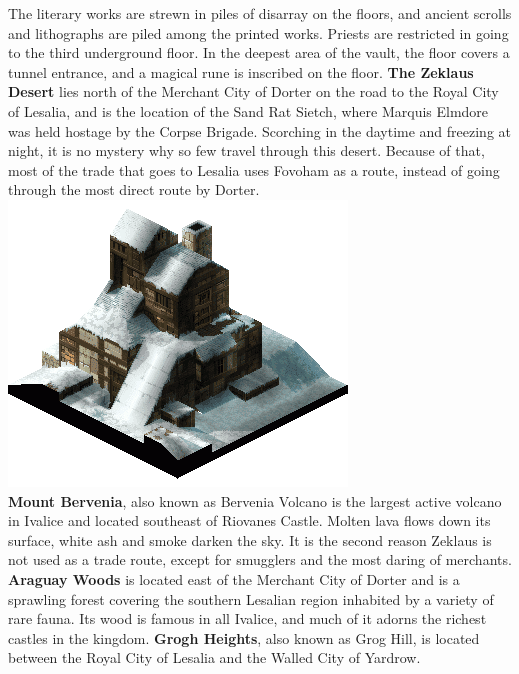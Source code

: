 The literary works are strewn in piles of disarray on the floors, and ancient scrolls and lithographs are piled among the printed works. 
Priests are restricted in going to the third underground floor. 
In the deepest area of the vault, the floor covers a tunnel entrance, and a magical rune is inscribed on the floor.
\textbf{The Zeklaus Desert} lies north of the Merchant City of Dorter on the road to the Royal City of Lesalia, and is the location of the Sand Rat Sietch, where Marquis Elmdore was held hostage by the Corpse Brigade. 
Scorching in the daytime and freezing at night, it is no mystery why so few travel through this desert. Because of that, most of the trade that goes to Lesalia uses Fovoham as a route, instead of going through the most direct route by Dorter.
%
\\
\includegraphics[width=\columnwidth]{./art/images/goland.png}
\\
%
\textbf{Mount Bervenia}, also known as Bervenia Volcano is the largest active volcano in Ivalice and located southeast of Riovanes Castle. Molten lava flows down its surface, white ash and smoke darken the sky. 
It is the second reason Zeklaus is not used as a trade route, except for smugglers and the most daring of merchants.
\textbf{Araguay Woods} is located east of the Merchant City of Dorter and is a sprawling forest covering the southern Lesalian region inhabited by a variety of rare fauna. 
Its wood is famous in all Ivalice, and much of it adorns the richest castles in the kingdom.
\textbf{Grogh Heights}, also known as Grog Hill, is located between the Royal City of Lesalia and the Walled City of Yardrow. 
